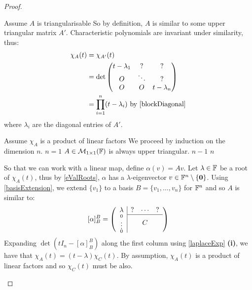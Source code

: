 \documentclass[../main.tex]{subfiles}
\begin{document}
\begin{proof}
  \begin{proofdirection}{Assume $A$ is triangularisable}
    So by definition, $A$ is similar to some upper triangular matrix $A'$.
    Characteristic polynomials are invariant under similarity, thus:
    \begin{align*}
      \chi_A(t) &= \chi_{A'}(t) \\
                &= \det \begin{pmatrix*}
                    t - \lambda_1 & ? & ? \\
                    O & \ddots & ? \\
                    O & O & t - \lambda_n \\
                    \end{pmatrix*} \\
                &= \prod_{i = 1}^{n} (t - \lambda_i) \text{ by \cref{blockDiagonal}}
    \end{align*}
    where $\lambda_i$ are the diagonal entries of $A'$.
  \end{proofdirection}
  \begin{proofdirection}{Assume $\chi_A$ is a product of linear factors}
    We proceed by induction on the dimension $n$.
    \quietinduction
    {$n = 1$}{
      $A \in \mathcal{M}_{1 \times 1}(\mathbb{F})$ is always upper triangular.
    }
    {$n - 1$}{}
    {$n$}{
      So that we can work with a linear map, define $\alpha(v) = Av$.
      Let $\lambda\in \mathbb{F}$ be a root of $\chi_A(t)$, thus by \cref{eValRoots}, $\alpha$ has a $\lambda$-eigenvector $v \in \mathbb{F}^{n} \setminus \{\mathbf{\bm{0}}\}$.
      Using \cref{basisExtension}, we extend $\{v_1\}$ to a basis $B = \{v_1, \ldots, v_n\}$ for $\mathbb{F}^{n}$ and so $A$ is similar to:
      \[
        [\alpha]^{B}_{B} = \left(\begin{array}{c c c c}
      \multicolumn{1}{c|}{\lambda} & ? & \cdots & ? \\ \cline{2-4}
      \multicolumn{1}{c|}{\scriptstyle{\substack{0 \\ \vdots \\ 0}}} & \multicolumn{3}{c}{C} \\
      \end{array}\right)
      \]
      Expanding $\det(tI_n - [\alpha]^{B}_{B})$ along the first column using \cref{laplaceExp} \textbf{(i)}, we have that $\chi_A(t) = (t - \lambda) \chi_{C}(t)$.
      By assumption, $\chi_{A}(t)$ is a product of linear factors and so $\chi_{C}(t)$ must be also.

}
\end{proofdirection}
\end{proof}
\end{document}
